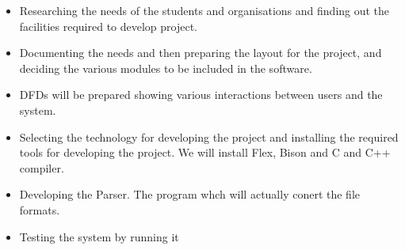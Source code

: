 \begin{itemize}
\item Researching the needs of the students and organisations and finding out the facilities required to develop project.
\item Documenting the needs and then preparing the layout for the project, and deciding the various modules to be included in the software.

\item  DFDs will be prepared showing various interactions between users and the system.

\item  Selecting the technology for developing the project and installing the required tools for developing the project. We will install Flex, Bison and C and C++ compiler.
\item Developing the Parser. The program whch will actually conert the file formats.

\item Testing the system by running it 

\end{itemize}
